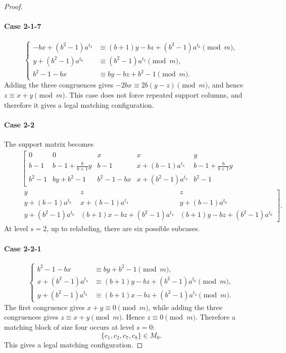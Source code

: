 \documentclass[11pt]{article}
\newcommand{\mymod}{\pmod{m}}
\begin{document}
\begin{proof}
\paragraph{Case 2-1-7}
$$
\begin{cases}
	-bx+(b^2-1)a^{t_2} &\equiv (b+1)y-bz+(b^2-1)a^{t_6}\mymod,\\
	y+(b^2-1)a^{t_6} &\equiv (b^2-1)a^{t_2}\mymod, \\
	b^2-1-bx &\equiv by-bz+b^2-1\mymod.
\end{cases}
$$
Adding the three congruences gives $-2bx\equiv2b(y-z)\mymod$, and hence $z\equiv x+y\mymod$. This case does not force repeated support columns, and therefore it gives a legal matching  configuration.

\paragraph{Case 2-2}
The support matrix becomes
\begin{eqnarray*}
		~&~&\left[\begin{array}{ccccc}
			0 & 0 & x & x & y\\
            b-1 & b-1+\frac{b}{b+1}y & b-1 & x+(b-1)a^{t_4} & b-1+\frac{b}{b+1}y \\
            b^2 -1 & by+b^2-1 & b^2-1-bx & x+(b^2-1)a^{t_4} & b^2-1
            \end{array}
            \right.\\
			~&~& \left. \begin{array}{ccc}              
			y & z & z\\			
			  y+(b-1)a^{t_6} & x+(b-1)a^{t_4}  & y+(b-1)a^{t_6}\\	
            y+(b^2-1)a^{t_6} & (b+1)x-bz+(b^2-1)a^{t_4} & (b+1)y-bz+(b^2-1)a^{t_6}
        \end{array}
        \right]
        .
\end{eqnarray*}
At level $s=2$, up to relabeling, there are six possible subcases.

\paragraph{Case 2-2-1}
$$
\begin{cases}
	b^2-1-bx &\equiv by+b^2-1\mymod, \\
	x+(b^2-1)a^{t_4} &\equiv (b+1)y-bz+(b^2-1)a^{t_6}\mymod,\\
	y+(b^2-1)a^{t_6} &\equiv (b+1)x-bz+(b^2-1)a^{t_4}\mymod.
\end{cases}
$$
The first congruence gives $x+y\equiv0\mymod$, while adding the three congruences gives $z\equiv x+y\mymod$. Hence $z\equiv0\mymod$. Therefore a matching block of size four occurs at level $s=0$:
$$
\{c_1,c_2,c_7,c_8\}\in M_0.
$$
This gives a legal matching configuration.


\end{proof}
\end{document}

